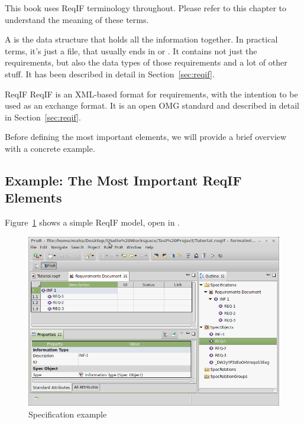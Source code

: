 \begin{info}
This book uses ReqIF terminology throughout.  Please refer to this chapter to understand the meaning of these terms.
\end{info}

A  is the data structure that holds all the information together.  In practical terms, it's just a file, that usually ends in  or .  It contains not just the requirements, but also the data types of those requirements and a lot of other stuff.  It has been described in detail in Section~\ref{sec:reqif}.

\begin{definition}{ReqIF}
ReqIF is an XML-based format for requirements, with the intention to be used as an exchange format.  It is an open OMG standard and described in detail in Section~\ref{sec:reqif}.
\end{definition}

Before defining the most important elements, we will provide a brief overview with a concrete example.

\subsection{Example: The Most Important ReqIF Elements}

Figure~\ref{fig:spec_example} shows a simple ReqIF model, open in \pror{}.  

\begin{figure}
  \centering
  \includegraphics[width=\textwidth]{../rmf-images/screenshot_INF_1.png}
  \caption{Specification example}
  \label{fig:spec_example}
\end{figure}

